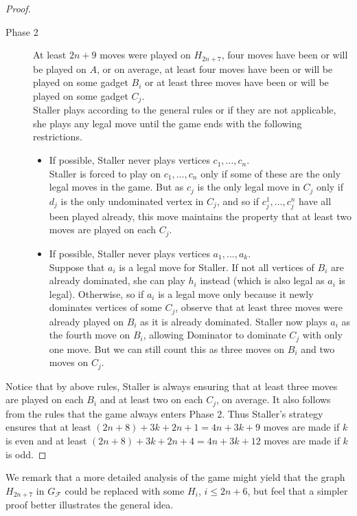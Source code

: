\documentclass[12pt]{article}
\newcommand{\F}{\mathcal{F}}
\begin{document}
\begin{proof}
\begin{description}
		\item[Phase 2] At least $2n+9$ moves were played on $H_{2n+7}$, four moves have been or will be played on $A$, or on average, at least four moves have been or will be played on some gadget $B_i$ or at least three moves have been or will be played on some gadget $C_j$.\\
		Staller plays according to the general rules or if they are not applicable, she plays any legal move until the game ends with the following restrictions.
		\begin{itemize}
			\item If possible, Staller never plays vertices $c_1, \ldots, c_n$.\\
			Staller is forced to play on $c_1, \ldots, c_n$ only if some of these are the only legal moves in the game. But as $c_j$ is the only legal move in $C_j$ only if $d_j$ is the only undominated vertex in $C_j$, and so if $c_j^1, \ldots, c_j^n$ have all been played already, this move maintains the property that at least two moves are played on each $C_j$. 
			
			\item If possible, Staller never plays vertices $a_1, \ldots, a_k$.\\
			Suppose that $a_i$ is a legal move for Staller. If not all vertices of $B_i$ are already dominated, she can play $h_i$ instead (which is also legal as $a_i$ is legal). Otherwise, so if $a_i$ is a legal move only because it newly dominates vertices of some $C_j$, observe that at least three moves were already played on $B_i$ as it is already dominated. Staller now plays $a_i$ as the fourth move on $B_i$, allowing Dominator to dominate $C_j$ with only one move. But we can still count this as three moves on $B_i$ and two moves on $C_j$.
		\end{itemize}
	\end{description}
	
	Notice that by above rules, Staller is always ensuring that at least three moves are played on each $B_i$ and at least two on each $C_j$, on average. It also follows from the rules that the game always enters Phase 2. Thus Staller's strategy ensures that at least $(2n+8) + 3k + 2n + 1 = 4n+3k + 9$ moves are made if $k$ is even and at least $(2n+8) + 3k + 2n + 4 = 4n+3k + 12$ moves are made if $k$ is odd.
\end{proof}

We remark that a more detailed analysis of the game might yield that the graph $H_{2n+7}$ in $G_\F$ could be replaced with some $H_i$, $i \leq 2n+6$, but feel that a simpler proof better illustrates the general idea.
\end{document}
